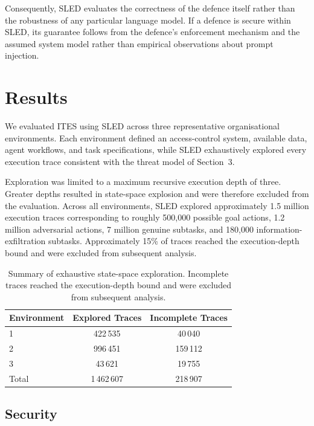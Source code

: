 \documentclass{article} %
\begin{document}
Consequently, SLED evaluates the correctness of the defence itself rather than the robustness of any particular language model. If a defence is secure within SLED, its guarantee follows from the defence's enforcement mechanism and the assumed system model rather than empirical observations about prompt injection.





\section{Results}

We evaluated ITES using SLED across three representative organisational environments. Each environment defined an access-control system, available data, agent workflows, and task specifications, while SLED exhaustively explored every execution trace consistent with the threat model of Section~3.

Exploration was limited to a maximum recursive execution depth of three. Greater depths resulted in state-space explosion and were therefore excluded from the evaluation. Across all environments, SLED explored approximately 1.5 million execution traces corresponding to roughly 500,000 possible goal actions, 1.2 million adversarial actions, 7 million genuine subtasks, and 180,000 information-exfiltration subtasks. Approximately 15\% of traces reached the execution-depth bound and were excluded from subsequent analysis.

\begin{table}[h]
\centering
\begin{tabular}{lcc}
\hline
Environment & Explored Traces & Incomplete Traces\\
\hline
1 & 422\,535 & 40\,040\\
2 & 996\,451 & 159\,112\\
3 & 43\,621 & 19\,755\\
\hline
Total & 1\,462\,607 & 218\,907\\
\hline
\end{tabular}
\caption{Summary of exhaustive state-space exploration. Incomplete traces reached the execution-depth bound and were excluded from subsequent analysis.}
\label{tab:exploration}
\end{table}

\subsection{Security}
\end{document}
